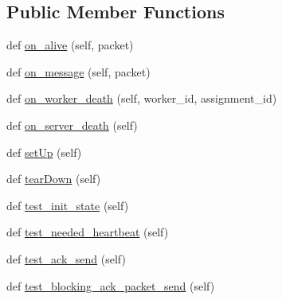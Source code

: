 \subsection*{Public Member Functions}
\begin{DoxyCompactItemize}
\item 
def \hyperlink{classparlai_1_1mturk_1_1core_1_1test_1_1test__socket__manager_1_1TestSocketManagerRoutingFunctionality_ab95a83b4b93a7672eda1e5ce59a15f85}{on\+\_\+alive} (self, packet)
\item 
def \hyperlink{classparlai_1_1mturk_1_1core_1_1test_1_1test__socket__manager_1_1TestSocketManagerRoutingFunctionality_a6019e9f094ea178fff5f504d040c18d8}{on\+\_\+message} (self, packet)
\item 
def \hyperlink{classparlai_1_1mturk_1_1core_1_1test_1_1test__socket__manager_1_1TestSocketManagerRoutingFunctionality_a733d46cdf09d214b23aba31674bfc2be}{on\+\_\+worker\+\_\+death} (self, worker\+\_\+id, assignment\+\_\+id)
\item 
def \hyperlink{classparlai_1_1mturk_1_1core_1_1test_1_1test__socket__manager_1_1TestSocketManagerRoutingFunctionality_a99bd283fec6b6422df3b0cd47ece433d}{on\+\_\+server\+\_\+death} (self)
\item 
def \hyperlink{classparlai_1_1mturk_1_1core_1_1test_1_1test__socket__manager_1_1TestSocketManagerRoutingFunctionality_a9879be1de300e68a7646337f265e907c}{set\+Up} (self)
\item 
def \hyperlink{classparlai_1_1mturk_1_1core_1_1test_1_1test__socket__manager_1_1TestSocketManagerRoutingFunctionality_a9d0fe73332471ebe54322b73a448d0f9}{tear\+Down} (self)
\item 
def \hyperlink{classparlai_1_1mturk_1_1core_1_1test_1_1test__socket__manager_1_1TestSocketManagerRoutingFunctionality_a8ee3ef59cf53f6c3ee50e0dd5db882fc}{test\+\_\+init\+\_\+state} (self)
\item 
def \hyperlink{classparlai_1_1mturk_1_1core_1_1test_1_1test__socket__manager_1_1TestSocketManagerRoutingFunctionality_acb247f8dc2442912c07558f3f7764ba0}{test\+\_\+needed\+\_\+heartbeat} (self)
\item 
def \hyperlink{classparlai_1_1mturk_1_1core_1_1test_1_1test__socket__manager_1_1TestSocketManagerRoutingFunctionality_ac3a1d4dcd39800c8b3443d2e2db5ad0f}{test\+\_\+ack\+\_\+send} (self)
\item 
def \hyperlink{classparlai_1_1mturk_1_1core_1_1test_1_1test__socket__manager_1_1TestSocketManagerRoutingFunctionality_a907258697c6983e9d93ad88a3ea83278}{test\+\_\+blocking\+\_\+ack\+\_\+packet\+\_\+send} (self)

\end{DoxyCompactItemize}
